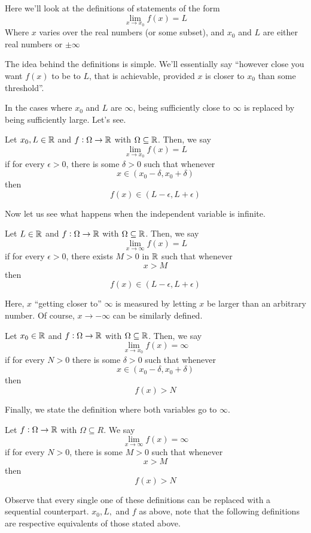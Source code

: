 

Here we'll look at the definitions of statements of the form
$$
\lim_{x\rightarrow x_0} f(x) = L
$$
Where $x$ varies over the real numbers (or some subset), and $x_0$ and $L$ are either real numbers or $\pm \infty$

The idea behind the definitions is simple. We'll essentially say ``however close you want $f(x)$ to be to $L$, that is achievable, provided $x$ is closer to $x_0$ than some threshold''.

In the cases where $x_0$ and $L$ are $\infty$, being sufficiently close to $\infty$ is replaced by being sufficiently large. Let's see.

\begin{SNP}{\dfn}{Let $x_0, L \in \mathbb{R}$ and $f: \Omega \rightarrow \mathbb{R}$ with $\Omega \subseteq \mathbb{R}$. Then, we say
$$
\lim_{x\rightarrow x_0} f(x) = L
$$
if for every $\epsilon > 0$, there is some $\delta > 0$ such that whenever
$$
x \in (x_0 - \delta, x_0 + \delta)
$$
then
$$
f(x) \in (L - \epsilon, L + \epsilon)
$$}
\end{SNP}
Now let us see what happens when the independent variable is infinite.
\begin{SNP}{\dfn}{Let $L \in \mathbb{R}$ and $f: \Omega \rightarrow \mathbb{R}$ with $\Omega \subseteq \mathbb{R}$. Then, we say
$$
\lim_{x\rightarrow \infty} f(x) = L
$$
if for every $\epsilon > 0$, there exists $M > 0$ in $\mathbb{R}$ such that whenever
$$
x > M
$$
then
$$
f(x) \in (L - \epsilon, L + \epsilon)
$$}
\end{SNP}
Here, $x$ ``getting closer to'' $\infty$ is measured by letting $x$ be larger than an arbitrary number. Of course, $x \rightarrow -\infty$ can be similarly defined.
\begin{SNP}{\dfn}{Let $x_0 \in \mathbb{R}$ and $f:\Omega \rightarrow \mathbb{R}$ with $\Omega \subseteq \mathbb{R}$. Then, we say
$$
\lim_{x\rightarrow x_0} f(x) = \infty
$$
if for every $N > 0$ there is some $\delta > 0$ such that whenever
$$
x \in (x_0 - \delta, x_0 + \delta)
$$
then
$$
f(x) > N
$$}
\end{SNP}
Finally, we state the definition where both variables go to $\infty$.
\begin{SNP}{\dfn}{Let $f:\Omega \rightarrow \mathbb{R}$ with $\Omega \subseteq R$. We say
$$
\lim_{x\rightarrow\infty}f(x) = \infty
$$
if for every $N > 0$, there is some $M > 0$ such that whenever
$$
x > M
$$
then
$$
f(x) > N
$$}
\end{SNP}
Observe that every single one of these definitions can be replaced with a sequential counterpart. $x_0, L, $ and $f$ as above, note that the following definitions are respective equivalents of those stated above.
